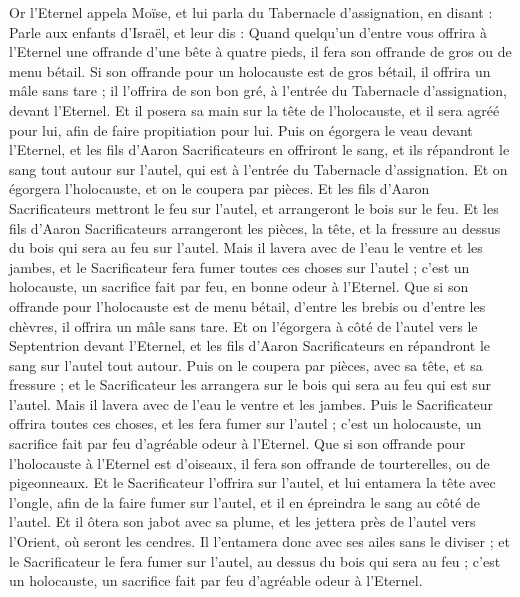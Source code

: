 \BFont
\begin{multicols}{2}
\VerseOne{}Or l'Eternel appela Moïse, et lui parla du Tabernacle d'assignation, en disant :
Parle aux enfants d'Israël, et leur dis : Quand quelqu'un d'entre vous offrira à l'Eternel une offrande d'une bête à quatre pieds, il fera son offrande de gros ou de menu bétail.
Si son offrande pour un holocauste est de gros bétail, il offrira un mâle sans tare ; il l'offrira de son bon gré, à l'entrée du Tabernacle d'assignation, devant l'Eternel.
Et il posera sa main sur la tête de l'holocauste, et il sera agréé pour lui, afin de faire propitiation pour lui.
Puis on égorgera le veau devant l'Eternel, et les fils d'Aaron Sacrificateurs en offriront le sang, et ils répandront le sang tout autour sur l'autel, qui est à l'entrée du Tabernacle d'assignation.
Et on égorgera l'holocauste, et on le coupera par pièces.
Et les fils d'Aaron Sacrificateurs mettront le feu sur l'autel, et arrangeront le bois sur le feu.
Et les fils d'Aaron Sacrificateurs arrangeront les pièces, la tête, et la fressure au dessus du bois qui sera au feu sur l'autel.
Mais il lavera avec de l'eau le ventre et les jambes, et le Sacrificateur fera fumer toutes ces choses sur l'autel ; c'est un holocauste, un sacrifice fait par feu, en bonne odeur à l'Eternel.
Que si son offrande pour l'holocauste est de menu bétail, d'entre les brebis ou d'entre les chèvres, il offrira un mâle sans tare.
Et on l'égorgera à côté de l'autel vers le Septentrion devant l'Eternel, et les fils d'Aaron Sacrificateurs en répandront le sang sur l'autel tout autour.
Puis on le coupera par pièces, avec sa tête, et sa fressure ; et le Sacrificateur les arrangera sur le bois qui sera au feu qui est sur l'autel.
Mais il lavera avec de l'eau le ventre et les jambes. Puis le Sacrificateur offrira toutes ces choses, et les fera fumer sur l'autel ; c'est un holocauste, un sacrifice fait par feu d'agréable odeur à l'Eternel.
Que si son offrande pour l'holocauste à l'Eternel est d'oiseaux, il fera son offrande de tourterelles, ou de pigeonneaux.
Et le Sacrificateur l'offrira sur l'autel, et lui entamera la tête avec l'ongle, afin de la faire fumer sur l'autel, et il en épreindra le sang au côté de l'autel.
Et il ôtera son jabot avec sa plume, et les jettera près de l'autel vers l'Orient, où seront les cendres.
Il l'entamera donc avec ses ailes sans le diviser ; et le Sacrificateur le fera fumer sur l'autel, au dessus du bois qui sera au feu ; c'est un holocauste, un sacrifice fait par feu d'agréable odeur à l'Eternel.

\end{multicols}
